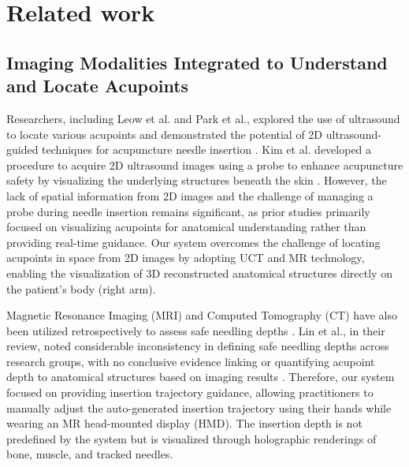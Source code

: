 \section{Related work}
\subsection{Imaging Modalities Integrated to Understand and Locate Acupoints}
Researchers, including Leow et al. and Park et al., explored the use of ultrasound to locate various acupoints and demonstrated the potential of 2D ultrasound-guided techniques for acupuncture needle insertion \cite{leow2017exploring, leow2017ultrasonography, park2011acupuncture}. Kim et al. developed a procedure to acquire 2D ultrasound images using a probe to enhance acupuncture safety by visualizing the underlying structures beneath the skin \cite{kim2017development}. However, the lack of spatial information from 2D images and the challenge of managing a probe during needle insertion remains significant, as prior studies primarily focused on visualizing acupoints for anatomical understanding rather than providing real-time guidance. Our system overcomes the challenge of locating acupoints in space from 2D images by adopting UCT and MR technology, enabling the visualization of 3D reconstructed anatomical structures directly on the patient’s body (right arm). 

Magnetic Resonance Imaging (MRI) and Computed Tomography (CT) have also been utilized retrospectively to assess safe needling depths \cite{chou2015retrospective, yang2015safe, chen2009therapeutic}. Lin et al., in their review, noted considerable inconsistency in defining safe needling depths across research groups, with no conclusive evidence linking or quantifying acupoint depth to anatomical structures based on imaging results \cite{lin2013exploration}. Therefore, our system focused on providing insertion trajectory guidance, allowing practitioners to manually adjust the auto-generated insertion trajectory using their hands while wearing an MR head-mounted display (HMD). The insertion depth is not predefined by the system but is visualized through holographic renderings of bone, muscle, and tracked needles.

\subsection{}

